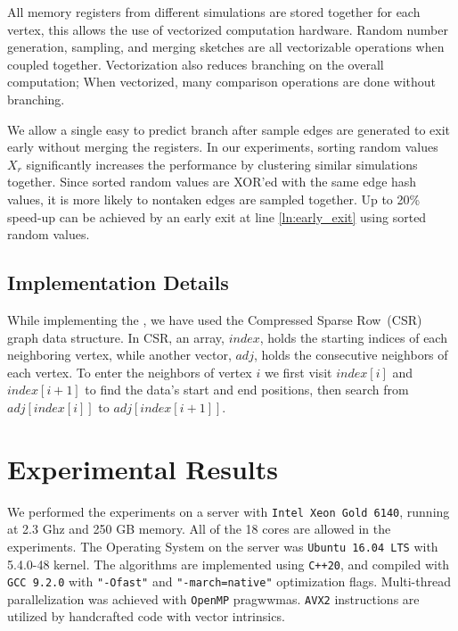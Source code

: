\documentclass[10pt,journal,compsoc]{IEEEtran}
\newcommand\acro{{\sc{HyperFuseR\xspace}\xspace}\xspace}
\begin{document}
 All memory registers from different simulations are stored together for each vertex, this allows the use of vectorized computation hardware. Random number generation, sampling, and merging sketches are all vectorizable operations when coupled together. Vectorization also reduces branching on the overall computation; When vectorized, many comparison operations are done without branching. 

We allow a single easy to predict branch after sample edges are generated to exit early without merging the registers. In our experiments, sorting random values $X_r$ significantly increases the performance by clustering similar simulations together. Since sorted random values are XOR'ed with the same edge hash values, it is more likely to nontaken edges are sampled together. Up to 20\% speed-up can be achieved by an early exit at line \ref{ln:early_exit} using sorted random values.

\subsection{Implementation Details}
While implementing the \acro, we have used the Compressed Sparse Row~(CSR) graph data structure.
In CSR, an array, $index$, holds the starting indices of each neighboring vertex, while another vector, $adj$, holds the consecutive neighbors of each vertex. 
To enter the neighbors of vertex $i$ we first visit $index[i]$ and $index[i+1]$ 
to find the data's start and end positions, then search from $adj[index[i]]$ to $adj[index[i+1]]$. 
    
\section{Experimental Results}\label{sec:evaluation}
We performed the experiments on a server with {\tt Intel Xeon Gold 6140}, running at 2.3 Ghz and 250 GB memory. All of the 18 cores are allowed in the experiments. The Operating System on the server was {\tt Ubuntu 16.04 LTS} with 5.4.0-48 kernel. The algorithms are implemented using {\tt C++20}, and compiled with {\tt GCC 9.2.0} with {\tt "-Ofast"} and {\tt "-march=native"} optimization flags. Multi-thread parallelization was achieved with {\tt OpenMP} pragwwmas. {\tt AVX2} instructions are utilized by handcrafted code with vector intrinsics.
\end{document}
